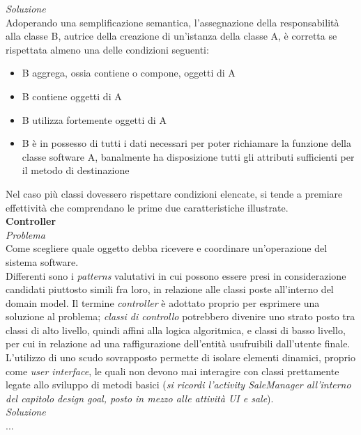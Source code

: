\documentclass{article}
\begin{document}
\textit{Soluzione}\\
Adoperando una semplificazione semantica, l'assegnazione della responsabilità alla classe B, autrice della creazione di un'istanza della classe A, è corretta se rispettata almeno una delle condizioni seguenti:
\begin{itemize}[label={-}]
    \itemsep0em
    \item B aggrega, ossia contiene o compone, oggetti di A 
    \item B contiene oggetti di A 
    \item B utilizza fortemente oggetti di A
    \item B è in possesso di tutti i dati necessari per poter richiamare la funzione della classe software A, banalmente ha disposizione tutti gli attributi sufficienti per il metodo di destinazione
\end{itemize}
Nel caso più classi dovessero rispettare condizioni elencate, si tende a premiare effettività che comprendano le prime due caratteristiche illustrate.\vspace*{14pt}\\
\textbf{Controller}\vspace*{7pt}\\
\textit{Problema}\\
Come scegliere quale oggetto debba ricevere e coordinare un'operazione del sistema software.\vspace*{7pt}\\
Differenti sono i \textit{patterns} valutativi in cui possono essere presi in considerazione candidati piuttosto simili fra loro, in relazione alle classi poste all'interno del domain model. Il termine \textit{controller} è adottato proprio per esprimere una soluzione al problema; \textit{classi di controllo} potrebbero divenire uno strato posto tra classi di alto livello, quindi affini alla logica algoritmica, e classi di basso livello, per cui in relazione ad una raffigurazione dell'entità usufruibili dall'utente finale. L'utilizzo di uno scudo sovrapposto permette di isolare elementi dinamici, proprio come \textit{user interface}, le quali non devono mai interagire con classi prettamente legate allo sviluppo di metodi basici (\textit{si ricordi l'activity SaleManager all'interno del capitolo design goal, posto in mezzo alle attività UI e sale}).\vspace*{14pt}\\
\textit{Soluzione}\\
...\vspace*{14pt}\\
\end{document}
